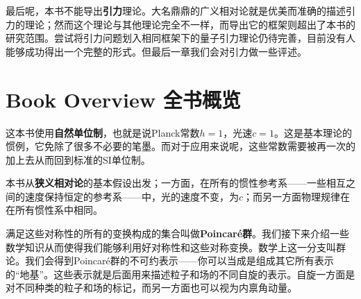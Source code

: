 最后呢，本书不能导出{\bf 引力}理论。大名鼎鼎的广义相对论就是优美而准确的描述引力的理论；然而这个理论与其他理论完全不一样，而导出它的框架则超出了本书的研究范围。尝试将引力问题划入相同框架下的量子引力理论仍待完善，目前没有人能够成功得出一个完整的形式。但最后一章我们会对引力做一些评述。

\section[全书概览]{Book Overview 全书概览}\label{sec1.2}

\begin{center}
\end{center}

这本书使用{\bf 自然单位制}，也就是说Planck常数$h = 1$，光速$c=1$。这是基本理论的惯例，它免除了很多不必要的笔墨。而对于应用来说呢，这些常数需要被再一次的加上去从而回到标准的SI单位制。

本书从{\bf 狭义相对论}的基本假设出发；一方面，在所有的惯性参考系——一些相互之间的速度保持恒定的参考系——中，光的速度不变，为$c$；而另一方面物理规律在在所有惯性系中相同。

满足这些对称性的所有的变换构成的集合叫做{\bf Poincaré群}。我们接下来介绍一些数学知识从而使得我们能够利用好对称性和这些对称变换。数学上这一分支叫群论。我们会得到Poincaré群的不可约表示——你可以当成是组成其它所有表示的“地基”。这些表示就是后面用来描述粒子和场的不同自旋的表示。自旋一方面是对不同种类的粒子和场的标记，而另一方面也可以视为内禀角动量。

